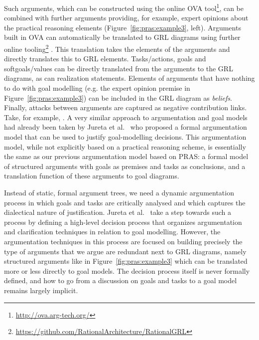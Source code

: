 Such arguments, which can be constructed using the online OVA tool\footnote{\url{http://ova.arg-tech.org/}}, can be combined with further arguments providing, for example, expert opinions about the practical reasoning elements (Figure~\ref{fig:pras:example3}, left). Arguments built in OVA can automatically be translated to GRL diagrams using further online tooling\footnote{\url{https://github.com/RationalArchitecture/RationalGRL}} \cite{vanZee-etal:comma2016}. This translation takes the elements of the arguments and directly translates this to GRL elements. Tasks/actions, goals and softgoals/values can be directly translated from the arguments to the GRL diagrams, as can realization statements. Elements of arguments that have nothing to do with goal modelling (e.g. the expert opinion premise in Figure~\ref{fig:pras:example3}) can be included in the GRL diagram as \emph{beliefs}. Finally, attacks between arguments are captured as negative contribution links. Take, for example, . A very similar approach to argumentation and goal models had already been taken by Jureta et al.~\cite{Jureta:RE2008} who proposed a formal argumentation model that can be used to justify goal-modelling decisions. This argumentation model, while not explicitly based on a practical reasoning scheme, is essentially the same as our previous argumentation model based on PRAS: a formal model of structured arguments with goals as premises and tasks as conclusions, and a translation function of these arguments to goal diagrams. 

Instead of static, formal argument trees, we need a dynamic argumentation process in which goals and tasks are critically analysed and which captures the dialectical nature of justification. Jureta et al.~\cite{Jureta:RE2008} take a step towards such a process by defining a high-level decision process that organizes argumentation and clarification techniques in relation to goal modelling. However, the argumentation techniques in this process are focused on building precisely the type of arguments that we argue are redundant next to GRL diagrams, namely structured arguments like in Figure~\ref{fig:pras:example3} which can be translated more or less directly to goal models. The decision process itself is never formally defined, and how to go from a discussion on goals and tasks to a goal model remains largely implicit. 
